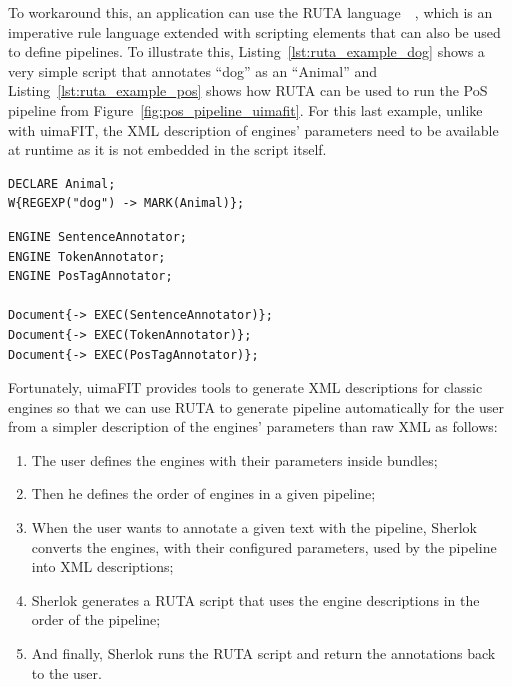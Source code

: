 \documentclass{article}
\begin{document}
To workaround this, an application can use the RUTA language~\cite{ruta}~\cite{ruta_2014}, which is
an imperative rule language extended with scripting elements that can also be used to define
pipelines. To illustrate this, Listing~\ref{lst:ruta_example_dog} shows a very simple script that
annotates ``dog'' as an ``Animal'' and Listing~\ref{lst:ruta_example_pos} shows how RUTA can be used
to run the PoS pipeline from Figure~\ref{fig:pos_pipeline_uimafit}. For this last example, unlike
with uimaFIT, the XML description of engines' parameters need to be available at runtime as it is
not embedded in the script itself.

\begin{lstlisting}[float,language=ruta,
                   caption=A basic RUTA script,
                   label=lst:ruta_example_dog]
DECLARE Animal;
W{REGEXP("dog") -> MARK(Animal)};
\end{lstlisting}

\begin{lstlisting}[float,language=ruta,
                   caption=PoS pipeline written in RUTA,
                   label=lst:ruta_example_pos]
ENGINE SentenceAnnotator;
ENGINE TokenAnnotator;
ENGINE PosTagAnnotator;

Document{-> EXEC(SentenceAnnotator)};
Document{-> EXEC(TokenAnnotator)};
Document{-> EXEC(PosTagAnnotator)};
\end{lstlisting}

Fortunately, uimaFIT provides tools to generate XML descriptions for classic engines so that we can
use RUTA to generate pipeline automatically for the user from a simpler description of the engines'
parameters than raw XML as follows:

\begin{enumerate}
    \item The user defines the engines with their parameters inside bundles;
    \item Then he defines the order of engines in a given pipeline;
    \item When the user wants to annotate a given text with the pipeline, Sherlok converts the
        engines, with their configured parameters, used by the pipeline into XML descriptions;
    \item Sherlok generates a RUTA script that uses the engine descriptions in the order of the
        pipeline;
    \item And finally, Sherlok runs the RUTA script and return the annotations back to the user.
\end{enumerate}
\end{document}
